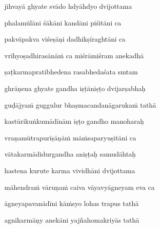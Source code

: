 jihvayā ghyate svādo hdyāhdyo dvijottama\thinspace{\dandab} \dontdisplaylinenum

phalamūlāni śākāni kandāni piśitāni ca \veg\dontdisplaylinenum
{}

pakvāpakva viśeṣāṇi dadhikṣīraghtāni ca\thinspace{\dandab} \dontdisplaylinenum

vrīhyoṣadhirasānāṁ ca miśrāmiśram anekadhā \veg\dontdisplaylinenum
{}

ṣaṭkarmapratibhedena rasabhedaśata smtam\thinspace{\dandab} \dontdisplaylinenum



ghrāṇena ghyate gandha iṣṭāniṣṭo dvijarṣabhaḥ \veg\dontdisplaylinenum
{}

guḍājyaṁ guggulur bhaṣmacandanāgarukaṁ tathā\thinspace{\dandab} \dontdisplaylinenum

kastūrikuṅkumādīnām iṣṭo gandho manoharaḥ \veg\dontdisplaylinenum
{}

vraṇamūtrapurīṣāṇāṁ māṁsaparyuṣitāni ca\thinspace{\dandab} \dontdisplaylinenum

vātakarmādidurgandha aniṣṭaḥ samudāhtaḥ \veg\dontdisplaylinenum



hastena kurute karma vividhāni dvijottama\thinspace{\dandab} \dontdisplaylinenum

māhendraṁ vāruṇaṁ caiva vāyavyāgneyam eva ca \veg\dontdisplaylinenum
{}

āgneyapavanādīni kāṁsyo lohas trapus tathā\thinspace{\dandab} \dontdisplaylinenum

agnikarmāṇy anekāni yajñahomakriyās tathā \veg\dontdisplaylinenum
{}

